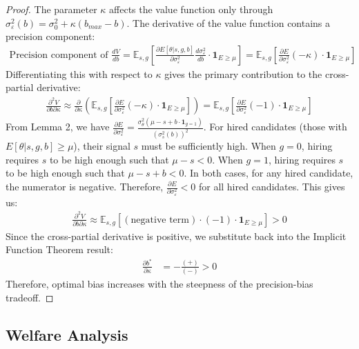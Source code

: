 \begin{proof}
The parameter $\kappa$ affects the value function only through $\sigma_\varepsilon^2(b) = \sigma_0^2 + \kappa(b_{max} - b)$. The derivative of the value function contains a precision component:
\begin{align}
\text{Precision component of } \frac{dV}{db} = \mathbb{E}_{s,g}\left[\frac{\partial E[\theta | s, g, b]}{\partial \sigma_\varepsilon^2} \frac{d\sigma_\varepsilon^2}{db} \cdot \mathbf{1}_{E \ge \mu} \right] = \mathbb{E}_{s,g}\left[\frac{\partial E}{\partial \sigma_\varepsilon^2} (-\kappa) \cdot \mathbf{1}_{E \ge \mu} \right]
\end{align}
Differentiating this with respect to $\kappa$ gives the primary contribution to the cross-partial derivative:
\begin{align}
\frac{\partial^2 V}{\partial b \partial \kappa} \approx \frac{\partial}{\partial \kappa} \left(\mathbb{E}_{s,g}\left[\frac{\partial E}{\partial \sigma_\varepsilon^2} (-\kappa) \cdot \mathbf{1}_{E \ge \mu} \right]\right) = \mathbb{E}_{s,g}\left[\frac{\partial E}{\partial \sigma_\varepsilon^2} (-1) \cdot \mathbf{1}_{E \ge \mu} \right]
\end{align}
From Lemma 2, we have $\frac{\partial E}{\partial \sigma_\varepsilon^2} = \frac{\sigma_\theta^2(\mu - s + b \cdot \mathbf{1}_{g=1})}{(\sigma_s^2(b))^2}$. For hired candidates (those with $E[\theta|s,g,b] \geq \mu$), their signal $s$ must be sufficiently high.
When $g=0$, hiring requires $s$ to be high enough such that $\mu-s < 0$. When $g=1$, hiring requires $s$ to be high enough such that $\mu-s+b < 0$. In both cases, for any hired candidate, the numerator is negative.
Therefore, $\frac{\partial E}{\partial \sigma_\varepsilon^2} < 0$ for all hired candidates. This gives us:
\begin{align}
\frac{\partial^2 V}{\partial b \partial \kappa} \approx \mathbb{E}_{s,g}\left[ (\text{negative term}) \cdot (-1) \cdot \mathbf{1}_{E \ge \mu} \right] > 0
\end{align}
Since the cross-partial derivative is positive, we substitute back into the Implicit Function Theorem result:
\begin{align}
\frac{\partial b^*}{\partial \kappa} &= -\frac{(+)}{(-)} > 0
\end{align}
Therefore, optimal bias increases with the steepness of the precision-bias tradeoff.
\end{proof}

\subsection{Welfare Analysis}


